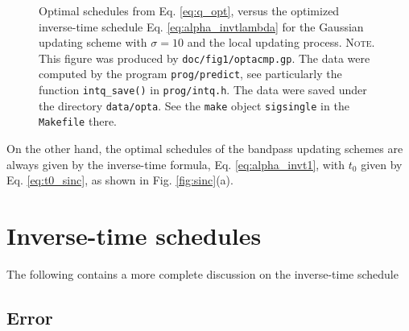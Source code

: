 \documentclass[reprint, floatfix]{revtex4-1}
\newcommand{\note}[1]{{\color{DarkGreen}\footnotesize \textsc{Note.} #1}}
\begin{document}
\begin{figure}[h]
\begin{center}
  \caption{
    \label{fig:optacmp}
    Optimal schedules from Eq. \eqref{eq:q_opt},
    versus the optimized inverse-time schedule
    Eq. \eqref{eq:alpha_invtlambda}
    for the Gaussian updating scheme
    with $\sigma = 10$
    and the local updating process.
    \note{This figure was produced by \texttt{doc/fig1/optacmp.gp}.
      The data were computed by the program \texttt{prog/predict},
      see particularly the function \texttt{intq\_save()}
      in \texttt{prog/intq.h}.
      The data were saved under the directory \texttt{data/opta}.
      See the \texttt{make} object \texttt{sigsingle}
      in the \texttt{Makefile} there.
    }%
  }
\end{center}
\end{figure}




On the other hand,
the optimal schedules of the bandpass updating schemes
are always given by the inverse-time formula,
Eq. \eqref{eq:alpha_invt1},
with $t_0$ given by Eq. \eqref{eq:t0_sinc},
as shown in Fig. \ref{fig:sinc}(a).
%


\appendix


\section{\label{sec:invt_schedule}
Inverse-time schedules}



The following contains a more complete discussion
on the inverse-time schedule


\subsection{\label{sec:invt_error}
Error
}
\end{document}
